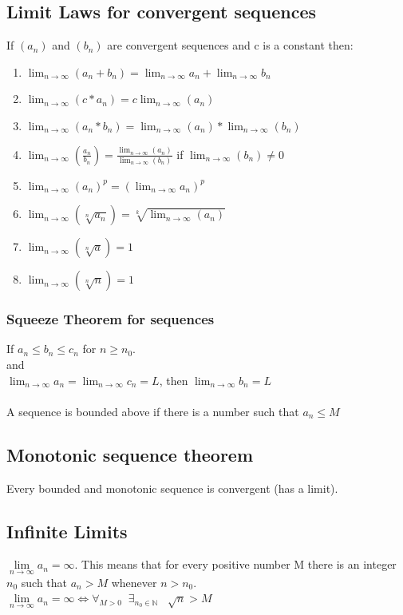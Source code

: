 \documentclass{article}
\begin{document}
 	\subsection{Limit Laws for convergent sequences}
 	If $(a_n)$ and $(b_n)$ are convergent sequences and c is a constant then:
 	\begin{enumerate}
 		\item $\lim_{n \to \infty } (a_n+b_n) = \lim_{n\to\infty} a_n + \lim_{n\to\infty} b_n$
 		\item $\lim_{n \to \infty } (c*a_n) = c\lim_{n \to \infty } (a_n)$
 		\item $\lim_{n \to \infty } (a_n*b_n) = \lim_{n \to \infty } (a_n) * \lim_{n \to \infty } (b_n)$
 		\item $\lim_{n \to \infty } (\frac{a_n}{b_n}) = \frac{\lim_{n \to \infty } (a_n)}{\lim_{n \to \infty } (b_n)}$ if $\lim_{n \to \infty } (b_n) \neq 0$ 
 		\item $\lim_{n \to \infty } (a_n)^p = (\lim_{n \to \infty }a_n)^p$
 		\item $\lim_{n \to \infty } (\sqrt[n]{a_n}) = \sqrt[k]{\lim_{n \to \infty } (a_n)}$
 		\item $\lim_{n \to \infty } (\sqrt[n]{a}) = 1$
 		\item $\lim_{n \to \infty } (\sqrt[n]{n}) = 1$
 	\end{enumerate}
 	\subsubsection{Squeeze Theorem for sequences}
 	If $a_n \leq b_n \leq c_n$ for $n \geq n_0$.\\
 	and \\
 	$\lim_{n\to\infty} a_n = \lim_{n\to\infty} c_n = L$, then $\lim_{n\to\infty} b_n = L$ \\ \\
 	A sequence is bounded above if there is a number such that $a_n \leq M $
 
 \subsection{Monotonic sequence theorem}
 Every bounded and monotonic sequence is convergent (has a limit).
 
 	
 
\subsection{Infinite Limits}
$\lim\limits_{n\to\infty} a_n = \infty$. This means that for every positive number M there is an integer $n_0$ such that $a_n>M$ whenever $n>n_0$. \\
$\lim\limits_{n\to\infty} a_n = \infty \Leftrightarrow \forall_{M>0} \;\; \exists_{ n_0\in\mathbb{N}} \;\;\; \sqrt{n} > M$ 
 
\end{document}
